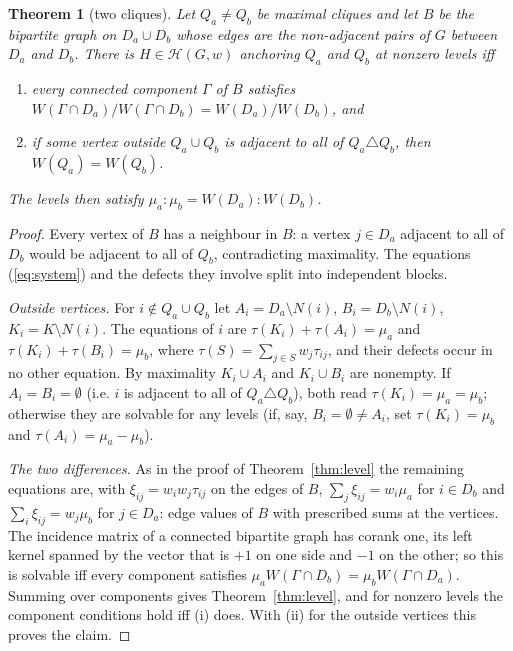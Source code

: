 \documentclass[11pt]{article}
\newtheorem{thm}{Theorem}[section]
\theoremstyle{definition}
\theoremstyle{remark}
\newcommand{\Hc}{\mathcal{H}}
\begin{document}
\begin{thm}[two cliques]
\label{thm:two}
Let $Q_a\neq Q_b$ be maximal cliques and let $B$ be the bipartite graph on
$D_a\cup D_b$ whose edges are the non-adjacent pairs of $G$ between $D_a$
and $D_b$. There is $H\in\Hc(G,w)$ anchoring $Q_a$ and $Q_b$ at nonzero
levels iff
\begin{enumerate}
\item[(i)] every connected component $\Gamma$ of $B$ satisfies
$W(\Gamma\cap D_a)/W(\Gamma\cap D_b)=W(D_a)/W(D_b)$, and
\item[(ii)] if some vertex outside $Q_a\cup Q_b$ is adjacent to all of
$Q_a\triangle Q_b$, then $W(Q_a)=W(Q_b)$.
\end{enumerate}
The levels then satisfy $\mu_a:\mu_b=W(D_a):W(D_b)$.
\end{thm}
\begin{proof}
Every vertex of $B$ has a neighbour in $B$: a vertex $j\in D_a$ adjacent to
all of $D_b$ would be adjacent to all of $Q_b$, contradicting maximality.
The equations (\ref{eq:system}) and the defects they involve split into
independent blocks.

{\em Outside vertices.} For $i\notin Q_a\cup Q_b$ let $A_i=D_a\setminus
N(i)$, $B_i=D_b\setminus N(i)$, $K_i=K\setminus N(i)$. The equations of $i$
are $\tau(K_i)+\tau(A_i)=\mu_a$ and $\tau(K_i)+\tau(B_i)=\mu_b$, where
$\tau(S)=\sum_{j\in S}w_j\tau_{ij}$, and their defects occur in no other
equation. By maximality $K_i\cup A_i$ and $K_i\cup B_i$ are nonempty. If
$A_i=B_i=\emptyset$ (i.e. $i$ is adjacent to all of $Q_a\triangle Q_b$),
both read $\tau(K_i)=\mu_a=\mu_b$; otherwise they are solvable for any
levels (if, say, $B_i=\emptyset\neq A_i$, set $\tau(K_i)=\mu_b$ and
$\tau(A_i)=\mu_a-\mu_b$).

{\em The two differences.} As in the proof of Theorem~\ref{thm:level} the
remaining equations are, with $\xi_{ij}=w_iw_j\tau_{ij}$ on the edges of
$B$, $\sum_j\xi_{ij}=w_i\mu_a$ for $i\in D_b$ and $\sum_i\xi_{ij}=w_j\mu_b$
for $j\in D_a$: edge values of $B$ with prescribed sums at the vertices.
The incidence matrix of a connected bipartite graph has corank one, its
left kernel spanned by the vector that is $+1$ on one side and $-1$ on the
other; so this is solvable iff every component satisfies
$\mu_aW(\Gamma\cap D_b)=\mu_bW(\Gamma\cap D_a)$. Summing over components
gives Theorem~\ref{thm:level}, and for nonzero levels the component
conditions hold iff (i) does. With (ii) for the outside vertices this
proves the claim.
\end{proof}
\end{document}
